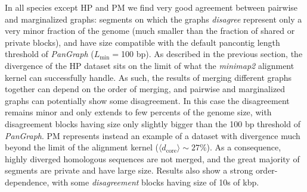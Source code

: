 \documentclass[aps,rmp,reprint,superscriptaddress,notitlepage,10pt,onecolumn]{revtex4-1}
\newcommand{\dcore}{\langle d_\text{core} \rangle}
\newcommand{\Lthr}{L_{\min}}
\begin{document}
In all species except HP and PM we find very good agreement between pairwise and marginalized graphs: segments on which the graphs \textit{disagree} represent only a very minor fraction of the genome (much smaller than the fraction of shared or private blocks), and have size compatible with the default pancontig length threshold of \textit{PanGraph} ($\Lthr =$100 bp).
As described in the previous section, the divergence of the HP dataset sits on the limit of what the \textit{minimap2} alignment kernel can successfully handle. As such, the results of merging different graphs together can depend on the order of merging, and pairwise and marginalized graphs can potentially show some disagreement. In this case the disagreement remains minor and only extends to few percents of the genome size, with disagreement blocks having size only slightly bigger than the 100 bp threshold of \textit{PanGraph}.
PM represents instead an example of a dataset with divergence much beyond the limit of the alignment kernel ($\dcore \sim 27 \%$). As a consequence, highly diverged homologous sequences are not merged, and the great majority of segments are private and have large size. Results also show a strong order-dependence, with some \textit{disagreement} blocks having size of 10s of kbp.
\end{document}

